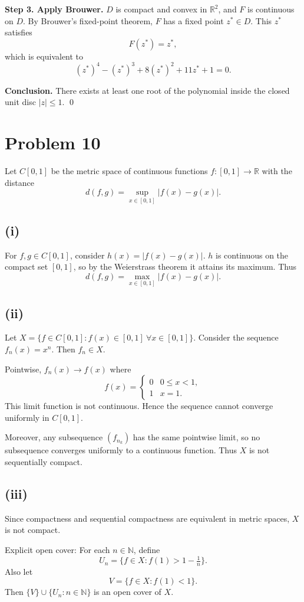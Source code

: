 \documentclass[11pt,a4paper]{article}
\theoremstyle{definition}
\theoremstyle{definition}
\theoremstyle{plain}
\theoremstyle{remark}
\begin{document}
\medskip

\textbf{Step 3. Apply Brouwer.}  
$D$ is compact and convex in $\mathbb{R}^2$, and $F$ is continuous on $D$.  
By Brouwer’s fixed-point theorem, $F$ has a fixed point $z^* \in D$.  
This $z^*$ satisfies
\[
F(z^*) = z^*,
\]
which is equivalent to
\[
(z^*)^4 - (z^*)^3 + 8(z^*)^2 + 11z^* + 1 = 0.
\]

\medskip
\textbf{Conclusion.}  
There exists at least one root of the polynomial inside the closed unit disc $|z|\leq 1$.
\qed

\section*{Problem 10}
Let $C[0,1]$ be the metric space of continuous functions $f:[0,1]\to\mathbb{R}$ with the distance
\[
d(f,g) = \sup_{x\in[0,1]} |f(x)-g(x)|.
\]

\subsection*{(i)}
For $f,g\in C[0,1]$, consider $h(x)=|f(x)-g(x)|$.  
$h$ is continuous on the compact set $[0,1]$, so by the Weierstrass theorem it attains its maximum.  
Thus
\[
d(f,g)=\max_{x\in[0,1]}|f(x)-g(x)|.
\]

\subsection*{(ii)}
Let $X=\{f\in C[0,1]: f(x)\in[0,1]\ \forall x\in[0,1]\}$.  
Consider the sequence $f_n(x)=x^n$. Then $f_n\in X$.  

Pointwise, $f_n(x)\to f(x)$ where
\[
f(x)=\begin{cases}
	0 & 0\leq x<1,\\
	1 & x=1.
\end{cases}
\]
This limit function is not continuous. Hence the sequence cannot converge uniformly in $C[0,1]$.  

Moreover, any subsequence $(f_{n_k})$ has the same pointwise limit, so no subsequence converges uniformly to a continuous function.  
Thus $X$ is not sequentially compact.

\subsection*{(iii)}
Since compactness and sequential compactness are equivalent in metric spaces, $X$ is not compact.  

Explicit open cover: For each $n\in\mathbb{N}$, define
\[
U_n=\{f\in X : f(1) > 1 - \tfrac{1}{n}\}.
\]
Also let
\[
V=\{f\in X : f(1)<1\}.
\]
Then $\{V\}\cup\{U_n: n\in\mathbb{N}\}$ is an open cover of $X$.  
\end{document}
